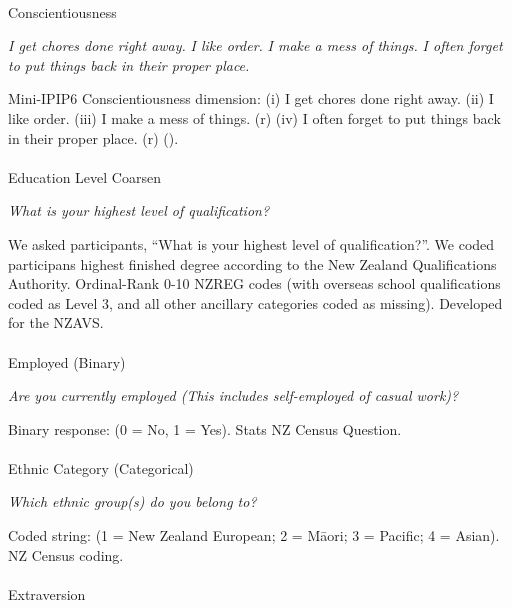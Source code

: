 \documentclass[
  single column]{article}
\makeatletter
\let\oldparagraph\paragraph
\renewcommand{\paragraph}{
    \@ifstar
      \xxxParagraphStar
      \xxxParagraphNoStar
  }
\newcommand{\xxxParagraphStar}[1]{\oldparagraph*{#1}\mbox{}}
\newcommand{\xxxParagraphNoStar}[1]{\oldparagraph{#1}\mbox{}}
\makeatother
\begin{document}
\paragraph{Conscientiousness}\label{conscientiousness}

\emph{I get chores done right away.} \emph{I like order.} \emph{I make a
mess of things.} \emph{I often forget to put things back in their proper
place.}

Mini-IPIP6 Conscientiousness dimension: (i) I get chores done right
away. (ii) I like order. (iii) I make a mess of things. (r) (iv) I often
forget to put things back in their proper place. (r)
().

\paragraph{Education Level Coarsen}\label{education-level-coarsen}

\emph{What is your highest level of qualification?}

We asked participants, ``What is your highest level of qualification?''.
We coded participans highest finished degree according to the New
Zealand Qualifications Authority. Ordinal-Rank 0-10 NZREG codes (with
overseas school qualifications coded as Level 3, and all other ancillary
categories coded as missing). Developed for the NZAVS.

\paragraph{Employed (Binary)}\label{employed-binary}

\emph{Are you currently employed (This includes self-employed of casual
work)?}

Binary response: (0 = No, 1 = Yes). Stats NZ Census Question.

\paragraph{Ethnic Category
(Categorical)}\label{ethnic-category-categorical}

\emph{Which ethnic group(s) do you belong to?}

Coded string: (1 = New Zealand European; 2 = Māori; 3 = Pacific; 4 =
Asian). NZ Census coding.

\paragraph{Extraversion}\label{extraversion}
\end{document}
